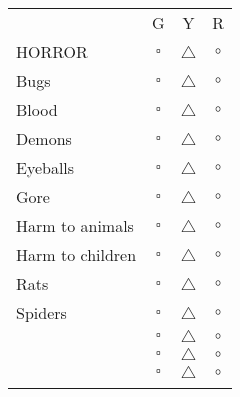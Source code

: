 \documentclass[11pt,twoside,a4paper]{article}
\begin{document}
\begin{multicols}{2}
	\begin{tabular}{ p{} c c c}
									&	{\color{green} G }	&	{\color{yellow} Y }	&	{\color{red} R }	\\
									
		HORROR \dotfill				&	{\color{green} $\square$ }	&	{\color{yellow} $\triangle$ }	&	{\color{red} $\circ$ }	\\ 
		Bugs \dotfill				&	{\color{green} $\square$ }	&	{\color{yellow} $\triangle$ }	&	{\color{red} $\circ$ }	\\ 
		Blood \dotfill				&	{\color{green} $\square$ }	&	{\color{yellow} $\triangle$ }	&	{\color{red} $\circ$ }	\\ 
		Demons \dotfill				&	{\color{green} $\square$ }	&	{\color{yellow} $\triangle$ }	&	{\color{red} $\circ$ }	\\ 
		Eyeballs \dotfill			&	{\color{green} $\square$ }	&	{\color{yellow} $\triangle$ }	&	{\color{red} $\circ$ }	\\ 
		Gore \dotfill				&	{\color{green} $\square$ }	&	{\color{yellow} $\triangle$ }	&	{\color{red} $\circ$ }	\\ 
		Harm to animals \dotfill	&	{\color{green} $\square$ }	&	{\color{yellow} $\triangle$ }	&	{\color{red} $\circ$ }	\\ 
		Harm to children \dotfill	&	{\color{green} $\square$ }	&	{\color{yellow} $\triangle$ }	&	{\color{red} $\circ$ }	\\ 
		Rats \dotfill				&	{\color{green} $\square$ }	&	{\color{yellow} $\triangle$ }	&	{\color{red} $\circ$ }	\\ 
		Spiders \dotfill			&	{\color{green} $\square$ }	&	{\color{yellow} $\triangle$ }	&	{\color{red} $\circ$ }	\\ 
		
		\hrulefill			&	{\color{green} $\square$ }	&	{\color{yellow} $\triangle$ }	&	{\color{red} $\circ$ }	\\
		\hrulefill			&	{\color{green} $\square$ }	&	{\color{yellow} $\triangle$ }	&	{\color{red} $\circ$ }	\\
		\hrulefill			&	{\color{green} $\square$ }	&	{\color{yellow} $\triangle$ }	&	{\color{red} $\circ$ }	\\
							&								&									&							\\
		

\end{tabular}
\end{multicols}
\end{document}
